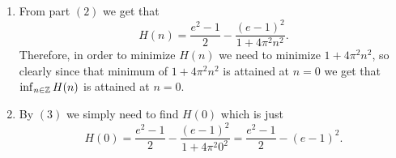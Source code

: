 \documentclass[11pt,a4paper]{article}
\begin{document}
\begin{solution}
\begin{enumerate}
      \[
        \int_{0}^{1} |e^x - \hat f(n) e^{2\pi i n x}|^2 \dx =
        \int_{0}^{1} |e^x|^2 - |\hat f(n)|^2 \dx =
        \frac{e^2 - 1}{2} - \frac{(e - 1)^2}{1 + 4 \pi^2 n^2}.
      \]
    \item[(3)] From part $(2)$ we get that
      \[
        H(n) =
        \frac{e^2 - 1}{2} - \frac{(e - 1)^2}{1 + 4 \pi^2 n^2}.
      \]
      Therefore, in order to minimize $H(n)$ we need to minimize
      $1 + 4 \pi^2 n^2$, so clearly since that minimum of
      $1 + 4 \pi^2 n^2$ is attained at $n = 0$ we get that
      $\inf_{n \in \mathbb{Z}} H(n)$ is attained at $n = 0$.
    \item[(4)] By $(3)$ we simply need to find $H(0)$ which is just
      \[
        H(0) =
        \frac{e^2 - 1}{2} - \frac{(e - 1)^2}{1 + 4 \pi^2 0^2} =
        \frac{e^2 - 1}{2} - (e - 1)^2.
      \]
  \end{enumerate}
\end{solution}
\end{document}
